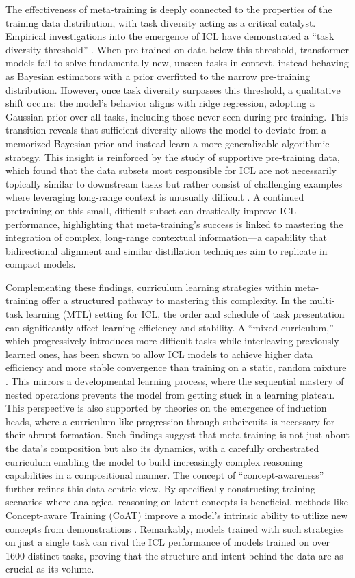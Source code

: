 \documentclass[11pt]{article}
\begin{document}
The effectiveness of meta-training is deeply connected to the properties of the training data distribution, with task diversity acting as a critical catalyst. Empirical investigations into the emergence of ICL have demonstrated a ``task diversity threshold'' \cite{ref48}. When pre-trained on data below this threshold, transformer models fail to solve fundamentally new, unseen tasks in-context, instead behaving as Bayesian estimators with a prior overfitted to the narrow pre-training distribution. However, once task diversity surpasses this threshold, a qualitative shift occurs: the model's behavior aligns with ridge regression, adopting a Gaussian prior over all tasks, including those never seen during pre-training. This transition reveals that sufficient diversity allows the model to deviate from a memorized Bayesian prior and instead learn a more generalizable algorithmic strategy. This insight is reinforced by the study of supportive pre-training data, which found that the data subsets most responsible for ICL are not necessarily topically similar to downstream tasks but rather consist of challenging examples where leveraging long-range context is unusually difficult \cite{ref41}. A continued pretraining on this small, difficult subset can drastically improve ICL performance, highlighting that meta-training's success is linked to mastering the integration of complex, long-range contextual information---a capability that bidirectional alignment and similar distillation techniques aim to replicate in compact models.

Complementing these findings, curriculum learning strategies within meta-training offer a structured pathway to mastering this complexity. In the multi-task learning (MTL) setting for ICL, the order and schedule of task presentation can significantly affect learning efficiency and stability. A ``mixed curriculum,'' which progressively introduces more difficult tasks while interleaving previously learned ones, has been shown to allow ICL models to achieve higher data efficiency and more stable convergence than training on a static, random mixture \cite{ref189}. This mirrors a developmental learning process, where the sequential mastery of nested operations prevents the model from getting stuck in a learning plateau. This perspective is also supported by theories on the emergence of induction heads, where a curriculum-like progression through subcircuits is necessary for their abrupt formation. Such findings suggest that meta-training is not just about the data's composition but also its dynamics, with a carefully orchestrated curriculum enabling the model to build increasingly complex reasoning capabilities in a compositional manner. The concept of ``concept-awareness'' further refines this data-centric view. By specifically constructing training scenarios where analogical reasoning on latent concepts is beneficial, methods like Concept-aware Training (CoAT) improve a model's intrinsic ability to utilize new concepts from demonstrations \cite{ref68,ref190}. Remarkably, models trained with such strategies on just a single task can rival the ICL performance of models trained on over 1600 distinct tasks, proving that the structure and intent behind the data are as crucial as its volume.
\end{document}
